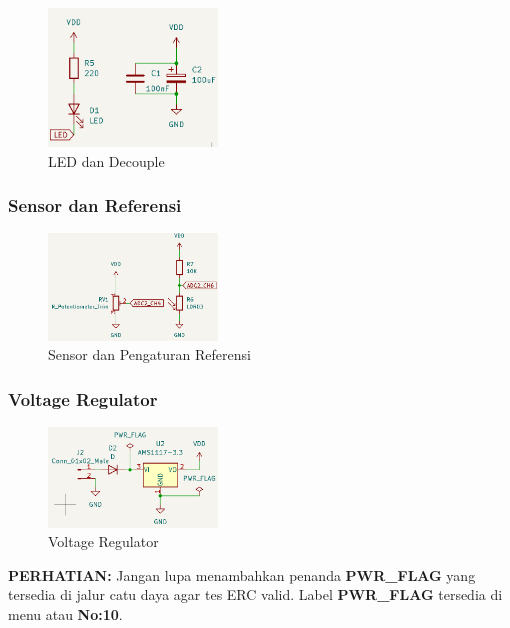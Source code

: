 \documentclass[12pt]{book}
\begin{document}
	\begin{figure}[!ht]
		\centering
		\includegraphics[width=0.4\textwidth]{images/sch/sch_19}
		\caption{LED dan Decouple}
	\end{figure}

	\subsubsection{Sensor dan Referensi}

	\begin{figure}[!ht]
		\centering
		\includegraphics[width=0.4\textwidth]{images/sch/sch_20}
		\caption{Sensor dan Pengaturan Referensi}
	\end{figure}

	\subsubsection{Voltage Regulator}

	\begin{figure}[!ht]
		\centering
		\includegraphics[width=0.4\textwidth]{images/sch/sch_21}
		\caption{Voltage Regulator}
	\end{figure}

	\textbf{PERHATIAN:} Jangan lupa menambahkan penanda \textbf{PWR\_FLAG} yang tersedia di
	jalur catu daya agar tes ERC valid.
	Label \textbf{PWR\_FLAG} tersedia di menu  atau \textbf{No:10}.
\end{document}
